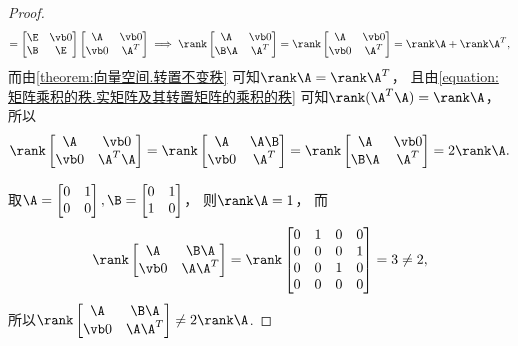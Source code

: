 \begin{example}
\begin{proof}
\begin{gather*}
	= \begin{bmatrix}
		\E & \vb0 \\
		\B & \E
	\end{bmatrix}
	\begin{bmatrix}
		\A & \vb0 \\
		\vb0 & \A^T
	\end{bmatrix}
	\implies
	\rank\begin{bmatrix}
		\A & \vb0 \\
		\B \A & \A^T
	\end{bmatrix}
	= \rank\begin{bmatrix}
		\A & \vb0 \\
		\vb0 & \A^T
	\end{bmatrix}
	= \rank\A + \rank\A^T,
\end{gather*}
而由\cref{theorem:向量空间.转置不变秩} 可知\(\rank\A = \rank\A^T\)，
且由\cref{equation:矩阵乘积的秩.实矩阵及其转置矩阵的乘积的秩} 可知\(\rank(\A^T \A) = \rank\A\)，
所以\begin{equation*}
	\rank\begin{bmatrix}
		\A & \vb0 \\
		\vb0 & \A^T \A
	\end{bmatrix}
	= \rank\begin{bmatrix}
		\A & \A \B \\
		\vb0 & \A^T
	\end{bmatrix}
	= \rank\begin{bmatrix}
		\A & \vb0 \\
		\B \A & \A^T
	\end{bmatrix}
	= 2 \rank\A.
\end{equation*}

取\(\A = \begin{bmatrix}
	0 & 1 \\
	0 & 0
\end{bmatrix},
\B = \begin{bmatrix}
	0 & 1 \\
	1 & 0
\end{bmatrix}\)，
则\(\rank\A = 1\)，
而\begin{equation*}
	\rank\begin{bmatrix}
		\A & \B \A \\
		\vb0 & \A \A^T
	\end{bmatrix}
	= \rank\begin{bmatrix}
		0 & 1 & 0 & 0 \\
		0 & 0 & 0 & 1 \\
		0 & 0 & 1 & 0 \\
		0 & 0 & 0 & 0
	\end{bmatrix}
	= 3 \neq 2,
\end{equation*}
所以\(\rank\begin{bmatrix}
	\A & \B \A \\
	\vb0 & \A \A^T
\end{bmatrix}
\neq 2 \rank\A\).
\end{proof}
\end{example}
